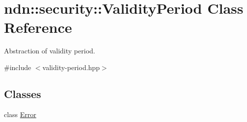 \hypertarget{classndn_1_1security_1_1ValidityPeriod}{}\section{ndn\+:\+:security\+:\+:Validity\+Period Class Reference}
\label{classndn_1_1security_1_1ValidityPeriod}


Abstraction of validity period.  




{\ttfamily \#include $<$validity-\/period.\+hpp$>$}

\subsection*{Classes}
\begin{DoxyCompactItemize}
\item 
class \hyperlink{classndn_1_1security_1_1ValidityPeriod_1_1Error}{Error}
\end{DoxyCompactItemize}
